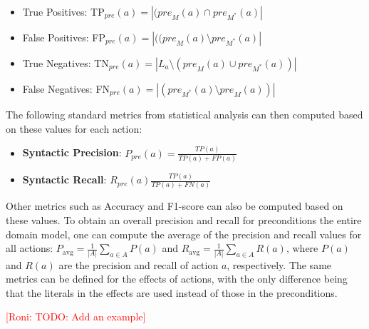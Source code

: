 \documentclass{article}
\theoremstyle{definition}
\theoremstyle{remark}
\newcommand{\realm}{\ensuremath{M^*}\xspace}
\newcommand{\pre}{\ensuremath{\textit{pre}}\xspace}
\newcommand{\eff}{\ensuremath{\textit{eff}}\xspace}
\newcommand{\roni}[1]{{\textcolor{red}{[Roni: #1]}}}
\begin{document}
 \begin{itemize}
    \item True Positives: TP$_\pre(a)=|(\pre_M(a)\cap \pre_\realm(a)|$
    \item False Positives: FP$_\pre(a)=|((\pre_M(a)\setminus \pre_\realm(a)|$
    \item True Negatives: TN$_\pre(a)=|L_a \setminus(\pre_M(a)\cup \pre_\realm(a))|$
    \item False Negatives: FN$_\pre(a)=|(\pre_\realm(a)\setminus \pre_M(a))|$
\end{itemize}
The following standard metrics from statistical analysis can then computed based on these values for each action:
\begin{itemize}
    \item \textbf{Syntactic Precision}: $P_\pre(a)=\frac{TP(a)}{TP(a)+FP(a)}$
    \item \textbf{Syntactic Recall}: $R_\pre(a)\frac{TP(a)}{TP(a)+FN(a)}$
\end{itemize}
Other metrics such as Accuracy and F1-score can also be computed based on these values. 
To obtain an overall precision and recall for preconditions the entire domain model, one can compute the average of the precision and recall values for all actions:
$P_\text{avg}=\frac{1}{|A|}\sum_{a\in A} P(a)$ and $R_\text{avg}=\frac{1}{|A|}\sum_{a\in A} R(a)$, where $P(a)$ and $R(a)$ are the precision and recall of action $a$, respectively. 
The same metrics can be defined for the effects of actions, with the only difference being that the literals in the effects are used instead of those in the preconditions. 

\roni{TODO: Add an example}

\end{document}
